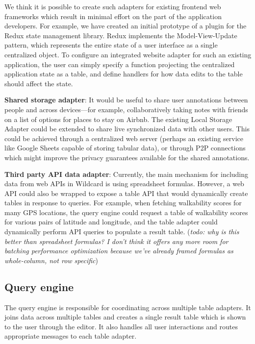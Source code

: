 \documentclass[sigplan,10pt,anonymous,review]{acmart}
\begin{document}
We think it is possible to create such adapters for existing frontend
web frameworks which result in minimal effort on the part of the
application developers. For example, we have created an initial
prototype of a plugin for the Redux state management library. Redux
implements the Model-View-Update pattern, which represents the entire
state of a user interface as a single centralized object. To configure
an integrated website adapter for such an existing application, the user
can simply specify a function projecting the centralized application
state as a table, and define handlers for how data edits to the table
should affect the state.

\textbf{Shared storage adapter}: It would be useful to share user
annotations between people and across devices---for example,
collaboratively taking notes with friends on a list of options for
places to stay on Airbnb. The existing Local Storage Adapter could be
extended to share live synchronized data with other users. This could be
achieved through a centralized web server (perhaps an existing service
like Google Sheets capable of storing tabular data), or through P2P
connections which might improve the privacy guarantees available for the
shared annotations.

\textbf{Third party API data adapter}: Currently, the main mechanism for
including data from web APIs in Wildcard is using spreadsheet formulas.
However, a web API could also be wrapped to expose a table API that
would dynamically create tables in response to queries. For example,
when fetching walkability scores for many GPS locations, the query
engine could request a table of walkability scores for various pairs of
latitude and longitude, and the table adapter could dynamically perform
API queries to populate a result table. (\emph{todo: why is this better
than spreadsheet formulas? I don't think it offers any more room for
batching performance optimization because we've already framed formulas
as whole-column, not row specific})

\hypertarget{query-engine}{%
\subsection{Query engine}\label{query-engine}}

The query engine is responsible for coordinating across multiple table
adapters. It joins data across multiple tables and creates a single
result table which is shown to the user through the editor. It also
handles all user interactions and routes appropriate messages to each
table adapter.
\end{document}
